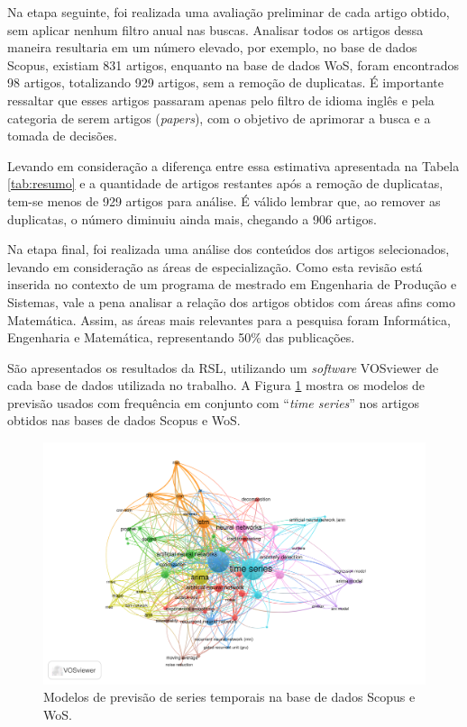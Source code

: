 Na etapa seguinte, foi realizada uma avaliação preliminar de cada artigo obtido, sem aplicar nenhum filtro anual nas buscas. Analisar todos os artigos dessa maneira resultaria em um número elevado, por exemplo, no base de dados Scopus, existiam 831 artigos, enquanto na base de dados WoS, foram encontrados 98 artigos, totalizando 929 artigos, sem a remoção de duplicatas. É importante ressaltar que esses artigos passaram apenas pelo filtro de idioma inglês e pela categoria de serem artigos (\textit{papers}), com o objetivo de aprimorar a busca e a tomada de decisões. 

Levando em consideração a diferença entre essa estimativa apresentada na Tabela \ref{tab:resumo} e a quantidade de artigos restantes após a remoção de duplicatas, tem-se menos de 929 artigos para análise. É válido lembrar que, ao remover as duplicatas, o número diminuiu ainda mais, chegando a 906 artigos.

Na etapa final, foi realizada uma análise dos conteúdos dos artigos selecionados, levando em consideração as áreas de especialização. Como esta revisão está inserida no contexto de um programa de mestrado em Engenharia de Produção e Sistemas, vale a pena analisar a relação dos artigos obtidos com áreas afins como Matemática. Assim, as áreas mais relevantes para a pesquisa foram Informática, Engenharia e Matemática, representando 50\% das publicações. 

São apresentados os resultados da RSL, utilizando um \textit{software} VOSviewer de cada base de dados utilizada no trabalho. 
A Figura \ref{fig:scopus-09-08} mostra os modelos de previsão usados com frequência em conjunto com ``\textit{time series}'' nos artigos obtidos nas bases de dados Scopus e WoS. 

\begin{figure}[!htb]
	\centering
	\caption{Modelos de previsão de series temporais na base de dados Scopus e WoS.}
	\label{fig:scopus-09-08}
	\includegraphics[width=\linewidth]{Revisao/Figuras/base-wos-scopus.pdf}
	
	
\end{figure}

